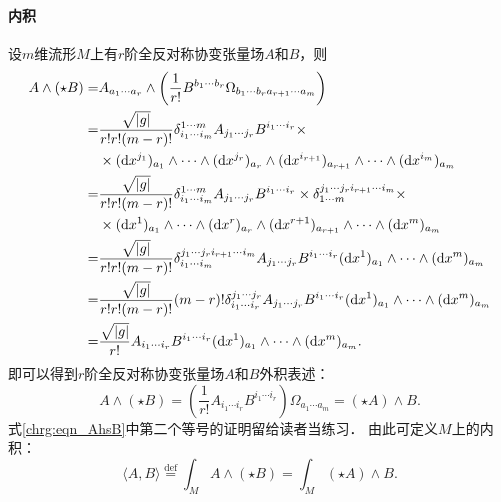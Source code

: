 \paragraph{内积}
设$m$维流形$M$上有$r$阶全反对称协变张量场$A$和$B$，则
\begin{align*}
	A \wedge (\star B) = & A_{a_1\cdots a_r} \wedge \left(\frac{1}{r!} B^{b_1 \cdots b_r} 
	\Omega_{b_1 \cdots b_r a_{r+1} \cdots a_m} \right)  \\
	=& \frac{\sqrt{|g|}}{r! r! (m-r)!} 
	\delta_{i_{1} \cdots i_m}^{1 \cdots m}	
	A_{j_1\cdots j_r}  B^{i_1\cdots i_r} \times \\
	&\times ({\rm d}x^{j_1})_{a_1} \wedge \cdots \wedge({\rm d}x^{j_r})_{a_r} 
	\wedge ({\rm d}x^{i_{r+1}})_{a_{r+1}} \wedge \cdots \wedge({\rm d}x^{i_m})_{a_m} \\
	=& \frac{\sqrt{|g|}}{r! r! (m-r)!} 
	\delta_{i_{1} \cdots i_m}^{1 \cdots m}	
	A_{j_1\cdots j_r}  B^{i_1\cdots i_r} \times
	\delta^{j_{1} \cdots j_r i_{r+1}\cdots i_m }_{1 \cdots m}	\times \\
	&\times ({\rm d}x^{1})_{a_1} \wedge \cdots \wedge({\rm d}x^{r})_{a_r} 
	\wedge ({\rm d}x^{r+1})_{a_{r+1}} \wedge \cdots \wedge({\rm d}x^{m})_{a_m} \\
	=& \frac{\sqrt{|g|}}{r! r! (m-r)!} 
	\delta_{i_{1} \cdots i_m}^{j_{1} \cdots j_r i_{r+1}\cdots i_m }
	A_{j_1\cdots j_r}  B^{i_1\cdots i_r} 
	({\rm d}x^{1})_{a_1} \wedge \cdots  \wedge({\rm d}x^{m})_{a_m} \\
	=& \frac{\sqrt{|g|}}{r! r! (m-r)!} (m-r)!
	\delta_{i_{1} \cdots i_r}^{j_{1} \cdots j_r }
	A_{j_1\cdots j_r}  B^{i_1\cdots i_r} 
	({\rm d}x^{1})_{a_1} \wedge \cdots  \wedge({\rm d}x^{m})_{a_m} \\
	=& \frac{\sqrt{|g|}}{r!} 
	A_{i_1\cdots i_r}  B^{i_1\cdots i_r} 
	({\rm d}x^{1})_{a_1} \wedge \cdots  \wedge({\rm d}x^{m})_{a_m}.
\end{align*}
即可以得到$r$阶全反对称协变张量场$A$和$B$外积表述：
\begin{equation}\label{chrg:eqn_AhsB}
	A \wedge (\star B) = \left(\frac{1}{r!} A_{i_1\cdots i_r}  B^{i_1\cdots i_r} \right) 
	\Omega_{a_{1} \cdots a_m} = (\star A) \wedge B.
\end{equation}
式\eqref{chrg:eqn_AhsB}中第二个等号的证明留给读者当练习．
由此可定义$M$上的内积：
\begin{equation}\label{chrg:eqn_AhsB-inner}
	\langle A, B\rangle \overset{\mathrm {def}}{=}\int_{M} A \wedge (\star B) = \int_{M} (\star A) \wedge B.
\end{equation}


